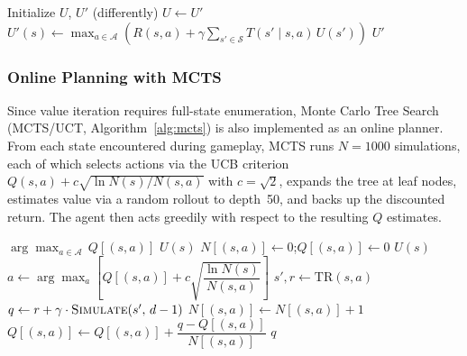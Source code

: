 \documentclass[conference]{IEEEtran}
\begin{document}
\begin{algorithm}
\caption{Value Iteration \cite{kochenderfer2022algorithms}}
\label{alg:vi}
\begin{algorithmic}[1]
\State Initialize $U$, $U'$ (differently)
\Repeat
  \State $U \gets U'$
    \State $U'(s) \gets \displaystyle\max_{a \in \mathcal{A}}
      \!\left(R(s,a) + \gamma\!\sum_{s'\in\mathcal{S}} T(s'\mid s,a)\,U(s')\right)$
  \EndFor
{}
\State \Return $U'$
\end{algorithmic}
\end{algorithm}

\subsubsection{Online Planning with MCTS}

Since value iteration requires full-state enumeration, Monte Carlo Tree Search
(MCTS/UCT, Algorithm~\ref{alg:mcts}) is also implemented as an online planner. From
each state encountered during gameplay, MCTS runs $N=1000$ simulations, each of which
selects actions via the UCB criterion $Q(s,a)+c\sqrt{\ln N(s)/N(s,a)}$ with
$c=\sqrt{2}$, expands the tree at leaf nodes, estimates value via a random rollout to
depth~50, and backs up the discounted return. The agent then acts greedily with respect
to the resulting $Q$ estimates.

\begin{algorithm}
\caption{Monte Carlo Tree Search (MCTS/UCT) \cite{kochenderfer2022algorithms}}
\label{alg:mcts}
\begin{algorithmic}[1]
    \State {}
  \EndFor
  \State \Return $\arg\max_{a \in \mathcal{A}}\, Q[(s, a)]$
\EndFunction
\Statex
{}
    \State \Return $U(s)$ 
  \EndIf
      \State $N[(s,a)] \gets 0$;\quad $Q[(s,a)] \gets 0$
    \EndFor
    \State \Return $U(s)$
  \EndIf
  \State $a \gets \arg\max_{a}\!\left[Q[(s,a)] + c\sqrt{\dfrac{\ln N(s)}{N(s,a)}}\right]$
  \State $s', r \gets \mathrm{TR}(s, a)$
  \State $q \gets r + \gamma \cdot \Call{Simulate}{s',\, d-1}$
  \State $N[(s,a)] \gets N[(s,a)] + 1$
  \State $Q[(s,a)] \gets Q[(s,a)] + \dfrac{q - Q[(s,a)]}{N[(s,a)]}$
  \State \Return $q$
\EndFunction
\end{algorithmic}
\end{algorithm}
\end{document}
